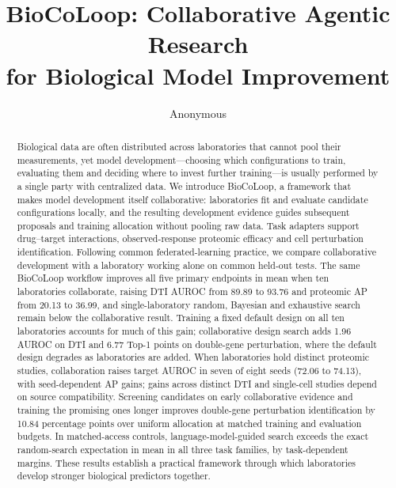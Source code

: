 \documentclass{article}
\begin{document}
\title{BioCoLoop: Collaborative Agentic Research\\for Biological Model Improvement}
\author{Anonymous}
\date{}
\maketitle

\begin{abstract}
Biological data are often distributed across laboratories that cannot pool their measurements, yet model development---choosing which configurations to train, evaluating them and deciding where to invest further training---is usually performed by a single party with centralized data. We introduce BioCoLoop, a framework that makes model development itself collaborative: laboratories fit and evaluate candidate configurations locally, and the resulting development evidence guides subsequent proposals and training allocation without pooling raw data. Task adapters support drug--target interactions, observed-response proteomic efficacy and cell perturbation identification. Following common federated-learning practice, we compare collaborative development with a laboratory working alone on common held-out tests. The same BioCoLoop workflow improves all five primary endpoints in mean when ten laboratories collaborate, raising DTI AUROC from 89.89 to 93.76 and proteomic AP from 20.13 to 36.99, and single-laboratory random, Bayesian and exhaustive search remain below the collaborative result. Training a fixed default design on all ten laboratories accounts for much of this gain; collaborative design search adds 1.96 AUROC on DTI and 6.77 Top-1 points on double-gene perturbation, where the default design degrades as laboratories are added. When laboratories hold distinct proteomic studies, collaboration raises target AUROC in seven of eight seeds (72.06 to 74.13), with seed-dependent AP gains; gains across distinct DTI and single-cell studies depend on source compatibility. Screening candidates on early collaborative evidence and training the promising ones longer improves double-gene perturbation identification by 10.84 percentage points over uniform allocation at matched training and evaluation budgets. In matched-access controls, language-model-guided search exceeds the exact random-search expectation in mean in all three task families, by task-dependent margins. These results establish a practical framework through which laboratories develop stronger biological predictors together.
\end{abstract}
\end{document}
